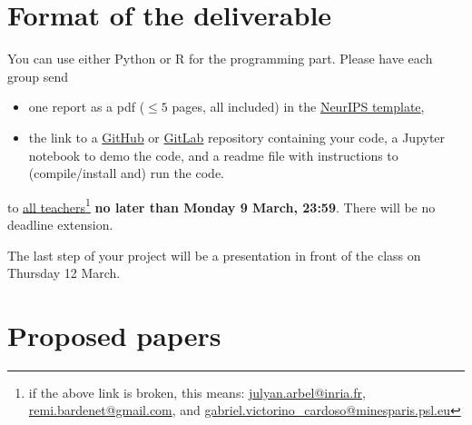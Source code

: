 \documentclass[12pt]{article}%
\begin{document}
\section{Format of the deliverable}
You can use either Python or R for the programming part. Please have each group send
\begin{itemize}
\item one report as a pdf ($\leq 5$ pages, all included) in the \href{https://www.overleaf.com/latex/templates/neurips-2020/mnshsmqkjsqz}{NeurIPS template},
\item the link to a \href{https://github.com/}{GitHub} or  \href{https://about.gitlab.com/}{GitLab} repository containing your code, a Jupyter notebook to demo the code, and a readme file with instructions to (compile/install and) run the code.
\end{itemize} to \href{mailto:julyan.arbel@inria.fr,remi.bardenet@gmail.com,gabriel.victorino_cardoso@minesparis.psl.eu}{all teachers}\footnote{if the above link is broken, this means: \href{mailto:julyan.arbel@inria.fr}{julyan.arbel@inria.fr}, \href{mailto:remi.bardenet@gmail.com}{remi.bardenet@gmail.com}, and \href{gabriel.victorino_cardoso@minesparis.psl.eu}{gabriel.victorino\_cardoso@minesparis.psl.eu}} {\bf no later than Monday 9 March, 23:59}. There will be no deadline extension.

The last step of your project will be a presentation in front of the class on Thursday 12 March.

\section{Proposed papers}
\label{s:papers}

\end{document}
